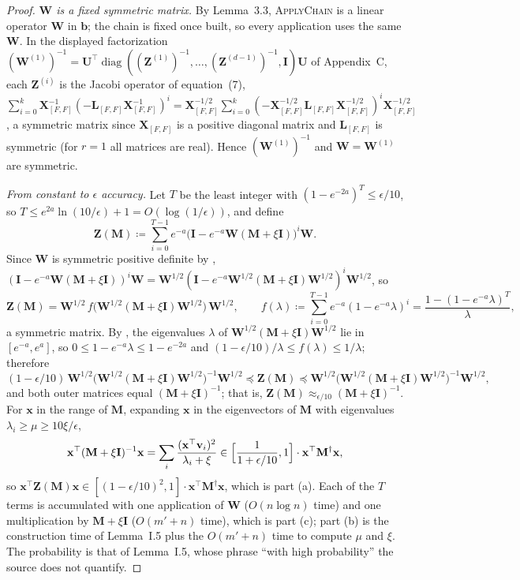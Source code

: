 \documentclass[11pt]{article}
\theoremstyle{remark}
\newcommand{\II}{\mathbf I}
\newcommand{\LL}{\mathbf L}
\newcommand{\MM}{\mathbf M}
\newcommand{\WW}{\mathbf W}
\newcommand{\xx}{\mathbf x}
\newcommand{\XX}{\mathbf X}
\newcommand{\UU}{\mathbf U}
\newcommand{\ZZ}{\mathbf Z}
\newcommand{\defeq}{\coloneqq}
\newcommand{\bb}{\mathbf b}
\newcommand{\vv}{\mathbf v}
\begin{document}
\begin{proof}
\emph{$\WW$ is a fixed symmetric matrix.}
By Lemma~3.3, \textsc{ApplyChain} is a linear operator $\WW$ in $\bb$; the
chain is fixed once built, so every application uses the same $\WW$.
In the displayed factorization
$(\WW^{(1)})^{-1}=\UU^{\top}\operatorname{diag}((\ZZ^{(1)})^{-1},\dots,
(\ZZ^{(d-1)})^{-1},\II)\UU$ of Appendix~C, each $\ZZ^{(i)}$ is the Jacobi
operator of equation~(7),
$\sum_{i=0}^{k}\XX_{[F,F]}^{-1}(-\LL_{[F,F]}\XX_{[F,F]}^{-1})^{i}
=\XX_{[F,F]}^{-1/2}\sum_{i=0}^{k}(-\XX_{[F,F]}^{-1/2}\LL_{[F,F]}
\XX_{[F,F]}^{-1/2})^{i}\XX_{[F,F]}^{-1/2}$, a symmetric matrix since
$\XX_{[F,F]}$ is a positive diagonal matrix and $\LL_{[F,F]}$ is symmetric
(for $r=1$ all matrices are real).
Hence $(\WW^{(1)})^{-1}$ and $\WW=\WW^{(1)}$ are symmetric.

\emph{From constant to $\epsilon$ accuracy.}
Let $T$ be the least integer with $(1-e^{-2a})^{T}\le\epsilon/10$, so
$T\le e^{2a}\ln(10/\epsilon)+1=O(\log(1/\epsilon))$, and define
\[
\ZZ(\MM)\defeq\sum_{i=0}^{T-1}e^{-a}
\bigl(\II-e^{-a}\WW(\MM+\xi\II)\bigr)^{i}\WW .
\]
Since $\WW$ is symmetric positive definite by ,
$(\II-e^{-a}\WW(\MM+\xi\II))^{i}\WW
=\WW^{1/2}(\II-e^{-a}\WW^{1/2}(\MM+\xi\II)\WW^{1/2})^{i}\WW^{1/2}$, so
\[
\ZZ(\MM)=\WW^{1/2}\,f\bigl(\WW^{1/2}(\MM+\xi\II)\WW^{1/2}\bigr)\,\WW^{1/2},
\qquad
f(\lambda)\defeq\sum_{i=0}^{T-1}e^{-a}(1-e^{-a}\lambda)^{i}
=\frac{1-(1-e^{-a}\lambda)^{T}}{\lambda},
\]
a symmetric matrix.
By , the eigenvalues $\lambda$ of
$\WW^{1/2}(\MM+\xi\II)\WW^{1/2}$ lie in $[e^{-a},e^{a}]$, so
$0\le1-e^{-a}\lambda\le1-e^{-2a}$ and
$(1-\epsilon/10)/\lambda\le f(\lambda)\le1/\lambda$; therefore
\[
(1-\epsilon/10)\,\WW^{1/2}\bigl(\WW^{1/2}(\MM+\xi\II)\WW^{1/2}\bigr)^{-1}
\WW^{1/2}\preceq\ZZ(\MM)\preceq
\WW^{1/2}\bigl(\WW^{1/2}(\MM+\xi\II)\WW^{1/2}\bigr)^{-1}\WW^{1/2},
\]
and both outer matrices equal $(\MM+\xi\II)^{-1}$; that is,
$\ZZ(\MM)\approx_{\epsilon/10}(\MM+\xi\II)^{-1}$.
For $\xx$ in the range of $\MM$, expanding $\xx$ in the eigenvectors of
$\MM$ with eigenvalues $\lambda_i\ge\mu\ge10\xi/\epsilon$,
\[
\xx^{\top}(\MM+\xi\II)^{-1}\xx=\sum_i\frac{(\xx^{\top}\vv_i)^{2}}{\lambda_i+\xi}
\in\Bigl[\frac{1}{1+\epsilon/10},1\Bigr]\cdot\xx^{\top}\MM^{\dag}\xx ,
\]
so
$\xx^{\top}\ZZ(\MM)\xx\in[(1-\epsilon/10)^{2},1]\cdot\xx^{\top}\MM^{\dag}\xx$,
which is part (a).
Each of the $T$ terms is accumulated with one application of $\WW$
($O(n\log n)$ time) and one multiplication by $\MM+\xi\II$ ($O(m'+n)$
time), which is part (c); part (b) is the construction time of Lemma~I.5
plus the $O(m'+n)$ time to compute $\mu$ and $\xi$.
The probability is that of Lemma~I.5, whose phrase ``with high
probability'' the source does not quantify.
\end{proof}
\end{document}
